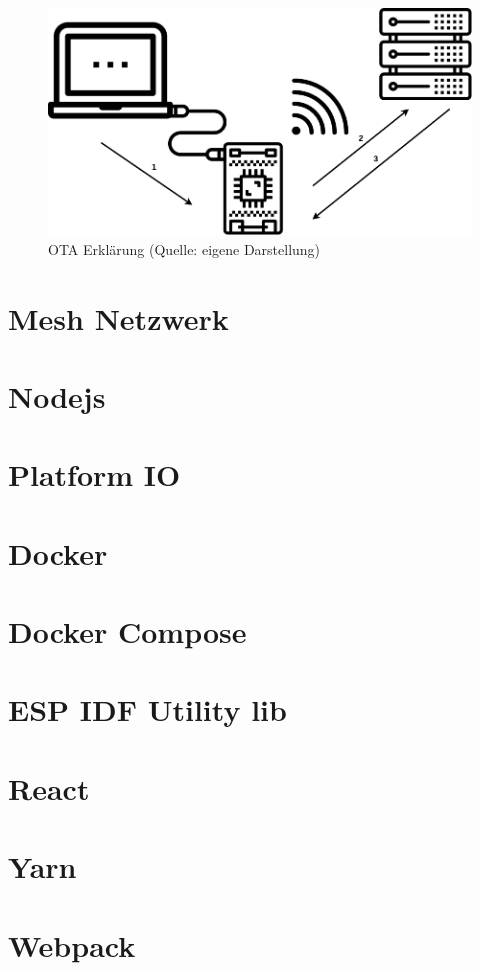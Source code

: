 \begin{figure}[H]
    \begin{center}
        \includegraphics[scale=.5]{images/ota-explanation.png}
        \caption{OTA Erklärung (Quelle: eigene Darstellung)}
    \end{center}    
\end{figure}

\section{Mesh Netzwerk}\label{sec:mesh}

\section{Nodejs}\label{sec:nodejs}

\section{Platform IO}\label{sec:platformio}

\section{Docker}\label{sec:docker}

\section{Docker Compose}\label{sec:docker-compose}

\section{ESP IDF Utility lib}\label{sec:esp-idf-utility-lib}

\section{React}\label{sec:react}

\section{Yarn}\label{sec:yarn}

\section{Webpack}\label{sec:webpack}
